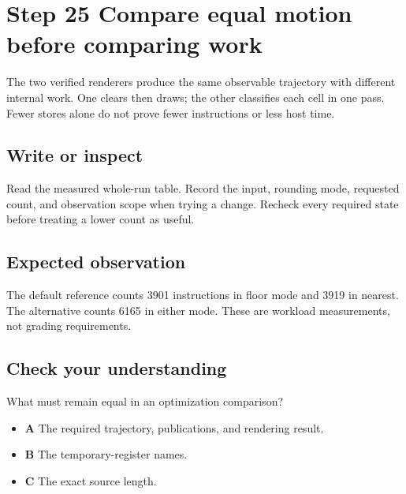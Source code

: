 \section{Step 25 Compare equal motion before comparing work}\label{ball-s25}

The two verified renderers produce the same observable trajectory with different internal work. One clears then draws; the other classifies each cell in one pass. Fewer stores alone do not prove fewer instructions or less host time.

\subsection{Write or inspect}
Read the measured whole-run table. Record the input, rounding mode, requested count, and observation scope when trying a change. Recheck every required state before treating a lower count as useful.

\subsection{Expected observation}
The default reference counts 3901 instructions in floor mode and 3919 in nearest. The alternative counts 6165 in either mode. These are workload measurements, not grading requirements.

\subsection{Check your understanding}
What must remain equal in an optimization comparison?

\begin{itemize}
  \item \textbf{A} The required trajectory, publications, and rendering result.
  \item \textbf{B} The temporary-register names.
  \item \textbf{C} The exact source length.
\end{itemize}
